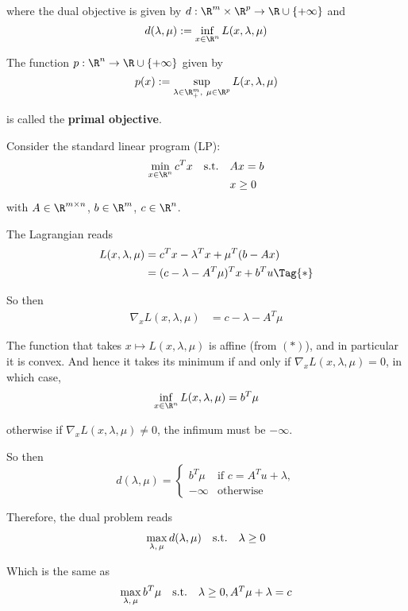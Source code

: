 where the dual objective is given by $d:\R^m\times\R^p\to\R\cup\{+\infty\}$ and
$$
  d(\lambda,\mu):=\inf_{x\in\R^n}L(x,\lambda,\mu)
$$

The function $p:\R^n\to\R\cup\{+\infty\}$ given by
$$
  p(x):=\sup_{\lambda\in\R^m_+,\ \mu\in\R^p}
  L(x,\lambda,\mu)
$$

is called the \textbf{primal objective}.

\label{ab8429b}

Consider the standard linear program (LP):
$$
  \begin{array}{l l l}
    \displaystyle \min_{x\in\R^n}c^Tx
     & \text{s.t.} & Ax=b   \\
     &             & x\geq0
  \end{array}
$$
with $A\in\R^{m\times n}$, $b\in\R^m$, $c\in\R^n$.

The Lagrangian reads
\begin{align*}
  L(x,\lambda,\mu)
   & =c^Tx-\lambda^Tx+\mu^T(b-Ax)         \\
   & =(c-\lambda-A^T\mu)^Tx + b^Tu\Tag{*}
\end{align*}


So then
\begin{align*}
  \nabla_xL(x,\lambda,\mu)
   & =c-\lambda-A^T\mu
\end{align*}

The function that takes $x\mapsto L(x,\lambda,\mu)$ is affine (from $(*)$), and
in particular it is convex. And hence it takes its minimum if and only if
$\nabla_xL(x,\lambda,\mu)=0$, in which case,
$$
  \inf_{x\in\R^n}L(x,\lambda,\mu)=b^T\mu
$$

otherwise if $\nabla_xL(x,\lambda,\mu)\neq0$, the infimum must be $-\infty$.

So then
$$
  d(\lambda,\mu)=\begin{cases}
    b^T\mu  & \text{if }c=A^Tu+\lambda, \\
    -\infty & \text{otherwise}
  \end{cases}
$$

Therefore, the dual problem reads
$$\begin{array}{l l l}\displaystyle
    \max_{\lambda,\,\mu}d(\lambda,\mu) & \text{s.t.} & \lambda\geq0
  \end{array}$$

Which is the same as
$$\begin{array}{l l l}\displaystyle
    \max_{\lambda,\,\mu}b^T\mu & \text{s.t.} & \lambda\geq0,A^T\mu+\lambda=c
  \end{array}$$

